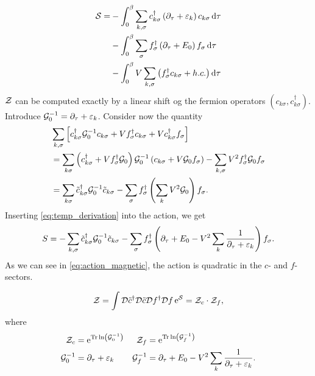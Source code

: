 \begin{align}
\begin{split}
\mathcal{S} = &- \int_0^\beta\sum_{k,\sigma}c_{k\sigma}^\dagger\left(\partial_\tau + \varepsilon_k\right)c_{k\sigma} \dd{\tau} \\
&-\int_0^\beta\sum_\sigma f_\sigma^\dagger\left(\partial_\tau + E_0\right)f_\sigma \dd{\tau}\\
&-\int_0^\beta V\sum_{k, \sigma}\left(f_\sigma^\dagger c_{k\sigma} + h.c.\right)\dd{\tau}
\end{split}
\end{align}
\(\mathcal{Z}\) can be computed exactly by a linear shift og the fermion operators \((c_{k\sigma}, c_{k\sigma}^\dagger)\). Introduce \(\mathcal{G}_0^{-1}= \partial_\tau + \varepsilon_k\). Consider now the quantity
\begin{align}
\label{eq:temp_derivation}
	&\sum_{k, \sigma}\left[c_{k\sigma}^\dagger \mathcal{G}_0^{-1}c_{k\sigma}+ Vf_{\sigma}^\dagger c_{k\sigma} + Vc_{k\sigma}^\dagger f_\sigma\right] \nonumber\\
	&= \sum_{k\sigma}\left(c_{k\sigma}^\dagger + Vf_\sigma^\dagger \mathcal{G}_0\right)\mathcal{G}_0^{-1}\left(c_{k\sigma} + V\mathcal{G}_0 f_\sigma\right) -\sum_{k,\sigma}V^2f_\sigma^\dagger \mathcal{G}_0 f_\sigma \nonumber\\
	&=\sum_{k\sigma}\tilde{c}_{k\sigma}^\dagger \mathcal{G}_0^{-1}\tilde{c}_{k\sigma} - \sum_\sigma f_\sigma^\dagger\left(\sum_k V^2\mathcal{G}_0\right)f_\sigma.
\end{align}
Inserting \eqref{eq:temp_derivation} into the action, we get
\begin{equation}
\label{eq:action_magnetic}
	S =-\sum_{k,\sigma}\tilde{c}_{k\sigma}^\dagger \mathcal{G}_0^{-1}\tilde{c}_{k\sigma}-\sum_\sigma f_\sigma^\dagger\left(\partial_\tau + E_0 - V^2\sum_k\frac{1}{\partial_\tau + \varepsilon_k}\right)f_\sigma.
\end{equation}
As we can see in \eqref{eq:action_magnetic}, the action is quadratic in the $c$- and $f$- sectors.

\begin{equation}
	\mathcal{Z} = \int\mathcal{D}\tilde{c}^\dagger\mathcal{D}\tilde{c}\mathcal{D} f^\dagger \mathcal{D} f\, \mathrm{e}^{\mathcal{S}}= \mathcal{Z}_c\cdot\mathcal{Z}_f,
\end{equation}
where 
\begin{align}
	\mathcal{Z}_c &= \mathrm{e}^{\Tr\ln \left(\mathcal{G}_0^{-1}\right)} & \mathcal{Z}_f&= \mathrm{e}^{\Tr\ln\left(\mathcal{G}_f^{-1}\right)}\\
	\label{eq:fermi_propagator}
	\mathcal{G}_0^{-1} &= \partial_\tau + \varepsilon_k &
	\mathcal{G}_f^{-1} &= \partial_\tau + E_0 -V^2\sum_k \frac{1}{\partial_\tau + \varepsilon_k}.
\end{align}

